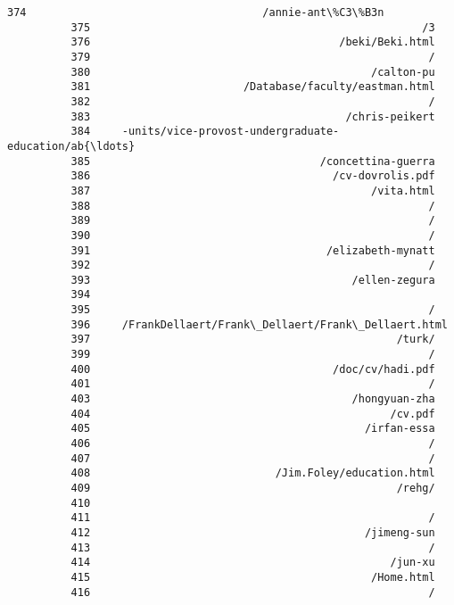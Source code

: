 \documentclass[11pt]{article}
\begin{document}
\begin{Verbatim}[commandchars=\\\{\}]
          374                                     /annie-ant\%C3\%B3n
          375                                                    /3
          376                                       /beki/Beki.html
          379                                                     /
          380                                            /calton-pu
          381                        /Database/faculty/eastman.html
          382                                                     /
          383                                        /chris-peikert
          384     -units/vice-provost-undergraduate-education/ab{\ldots}
          385                                    /concettina-guerra
          386                                      /cv-dovrolis.pdf
          387                                            /vita.html
          388                                                     /
          389                                                     /
          390                                                     /
          391                                     /elizabeth-mynatt
          392                                                     /
          393                                         /ellen-zegura
          394                                                      
          395                                                     /
          396     /FrankDellaert/Frank\_Dellaert/Frank\_Dellaert.html
          397                                                /turk/
          399                                                     /
          400                                      /doc/cv/hadi.pdf
          401                                                     /
          403                                         /hongyuan-zha
          404                                               /cv.pdf
          405                                           /irfan-essa
          406                                                     /
          407                                                     /
          408                             /Jim.Foley/education.html
          409                                                /rehg/
          410                                                      
          411                                                     /
          412                                           /jimeng-sun
          413                                                     /
          414                                               /jun-xu
          415                                            /Home.html
          416                                                     /

\end{Verbatim}
\end{document}
